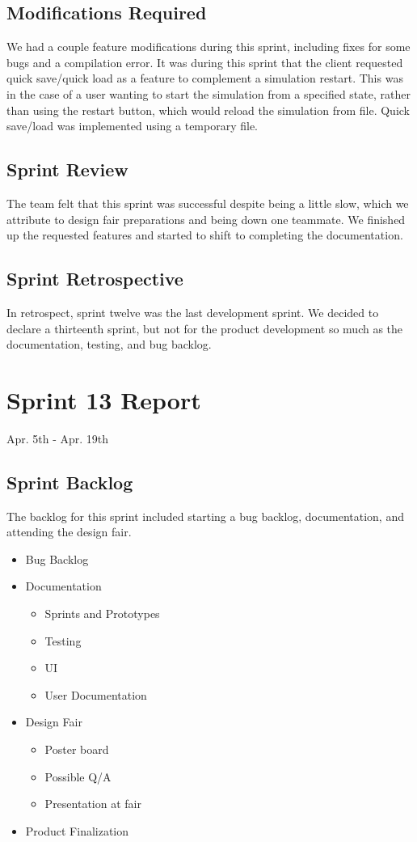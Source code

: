 \subsection{Modifications Required}
We had a couple feature modifications during this sprint, including fixes for some bugs and a compilation error. It was during this sprint that the client requested quick save/quick load as a feature to complement a simulation restart. This was in the case of a user wanting to start the simulation from a specified state, rather than using the restart button, which would reload the simulation from file. Quick save/load was implemented using a temporary file.

\subsection{Sprint Review}
The team felt that this sprint was successful despite being a little slow, which we attribute to design fair preparations and being down one teammate. We finished up the requested features and started to shift to completing the documentation.

\subsection{Sprint Retrospective}

In retrospect, sprint twelve was the last development sprint. We decided to declare a thirteenth sprint, but not for the product development so much as the documentation, testing, and bug backlog. 

\section{Sprint 13 Report}
Apr. 5th - Apr. 19th
\subsection{Sprint Backlog}

The backlog for this sprint included starting a bug backlog, documentation, and attending the design fair.

\begin{itemize}
	\item Bug Backlog
	\item Documentation		
	\begin{itemize}
		\item Sprints and Prototypes
		\item Testing
		\item UI
		\item User Documentation
	\end{itemize}
	\item Design Fair	
	\begin{itemize}
    	\item Poster board
    	\item Possible Q/A
    	\item Presentation at fair
	\end{itemize}
	\item Product Finalization
\end{itemize}

